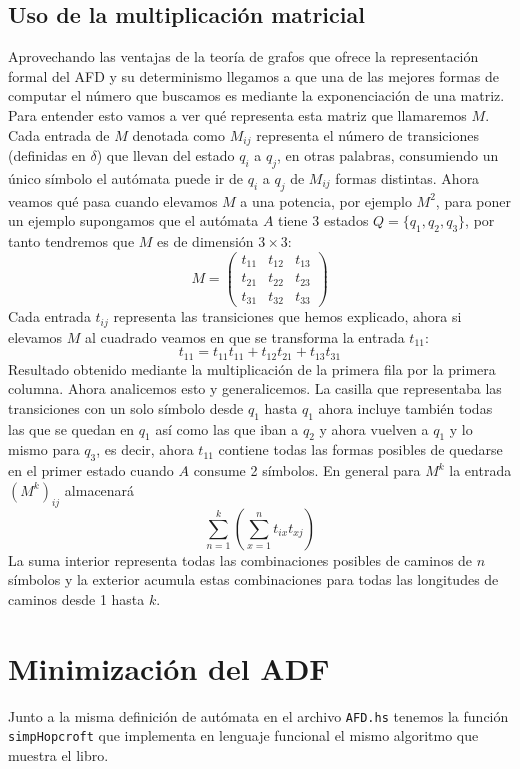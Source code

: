 \documentclass{scrartcl}
\begin{document}
\subsection{Uso de la multiplicación matricial}
Aprovechando las ventajas de la teoría de grafos que ofrece la representación formal del AFD y su determinismo llegamos a que una de las mejores formas de computar el número que buscamos es mediante la exponenciación de una matriz.
Para entender esto vamos a ver qué representa esta matriz que llamaremos $M$.
Cada entrada de $M$ denotada como $M_{ij}$ representa el número de transiciones (definidas en $\delta$) que llevan del estado $q_i$ a $q_j$, en otras palabras, consumiendo un único símbolo el autómata puede ir de $q_i$ a $q_j$ de $M_{ij}$ formas distintas.
Ahora veamos qué pasa cuando elevamos $M$ a una potencia, por ejemplo $M^2$, para poner un ejemplo supongamos que el autómata $A$ tiene 3 estados $Q = \{q_1, q_2, q_3\}$, por tanto tendremos que $M$ es de dimensión $3 \times 3$:
\[
M =
\begin{pmatrix}
t_{11} & t_{12} & t_{13} \\
t_{21} & t_{22} & t_{23} \\
t_{31} & t_{32} & t_{33}
\end{pmatrix}
\]
Cada entrada $t_{ij}$ representa las transiciones que hemos explicado, ahora si elevamos $M$ al cuadrado veamos en que se transforma la entrada $t_{11}$:
\[
t_{11} = t_{11}t_{11}+t_{12}t_{21}+t_{13}t_{31}
\]
Resultado obtenido mediante la multiplicación de la primera fila por la primera columna. Ahora analicemos esto y generalicemos. La casilla que representaba las transiciones con un solo símbolo desde $q_1$ hasta $q_1$ ahora incluye también todas las que se quedan en $q_1$ así como las que iban a $q_2$ y ahora vuelven a $q_1$ y lo mismo para $q_3$, es decir, ahora $t_{11}$ contiene todas las formas posibles de quedarse en el primer estado cuando $A$ consume 2 símbolos.
En general para $M^k$ la entrada $(M^k)_{ij}$ almacenará
\[
\sum_{n=1}^k \left( \sum_{x=1}^n t_{ix}t_{xj} \right)
\]
La suma interior representa todas las combinaciones posibles de caminos de $n$ símbolos y la exterior acumula estas combinaciones para todas las longitudes de caminos desde 1 hasta $k$.
\section{Minimización del ADF}
Junto a la misma definición de autómata en el archivo \texttt{AFD.hs} tenemos la función \texttt{simpHopcroft} que implementa en lenguaje funcional el mismo algoritmo que muestra el libro.
\end{document}
